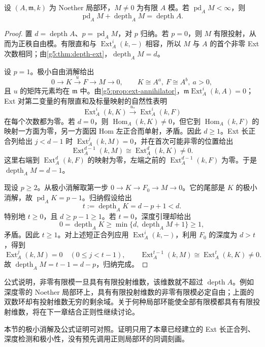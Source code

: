 \begin{theorem}\label{g5:thm:auslander-buchsbaum}
	设 \((A,\mathfrak m,k)\) 为 Noether 局部环，\(M\ne0\) 为有限 \(A\) 模。若 \(\operatorname{pd}_A M<\infty\)，则
	\[
		\operatorname{pd}_A M+\operatorname{depth}_A M
		=\operatorname{depth}A.
	\]
\end{theorem}
\begin{proof}
	置 \(d=\operatorname{depth}A\)、\(p=\operatorname{pd}_A M\)，对 \(p\) 归纳。若 \(p=0\)，则 \(M\) 有限投射，从而为正秩自由模。有限直和与 \(\operatorname{Ext}_A^i(k,-)\) 相容，所以 \(M\) 与 \(A\) 的首个非零 Ext 次数相同；由\cref{g5:thm:depth-ext}，\(\operatorname{depth}_A M=d\)。

	设 \(p=1\)。极小自由消解给出
	\[
		0\longrightarrow K\xrightarrow{u}F\longrightarrow M\longrightarrow0,
		\qquad K\cong A^a,\ F\cong A^b,\ a>0,
	\]
	且 \(u\) 的矩阵元素均在 \(\mathfrak m\) 中。由\cref{g5:prop:ext-annihilator}，\(\mathfrak m\operatorname{Ext}_A^i(k,A)=0\)；Ext 对第二变量的有限直和及标量映射的自然性表明
	\[
		\operatorname{Ext}_A^i(k,K)\xrightarrow{u_*}
		\operatorname{Ext}_A^i(k,F)
	\]
	在每个次数都为零。若 \(d=0\)，则 \(\operatorname{Hom}_A(k,K)\ne0\)，但它到 \(\operatorname{Hom}_A(k,F)\) 的映射一方面为零，另一方面因 Hom 左正合而单射，矛盾。因此 \(d\geq1\)。Ext 长正合列给出 \(j<d-1\) 时 \(\operatorname{Ext}_A^j(k,M)=0\)，并在首次可能非零的位置给出
	\[
		\operatorname{Ext}_A^{d-1}(k,M)
		\cong\operatorname{Ext}_A^d(k,K)\ne0.
	\]
	这里右端到 \(\operatorname{Ext}_A^d(k,F)\) 的映射为零，左端之前的 \(\operatorname{Ext}_A^{d-1}(k,F)\) 为零。于是 \(\operatorname{depth}_A M=d-1\)。

	现设 \(p\geq2\)。从极小消解取第一步
	\(0\to K\to F_0\to M\to0\)。它的尾部是 \(K\) 的极小消解，故 \(\operatorname{pd}_A K=p-1\)。归纳假设给出
	\[
		t:=\operatorname{depth}_A K=d-p+1<d.
	\]
	特别地 \(t\geq0\)，且 \(d\geq p-1\geq1\)。若 \(t=0\)，深度引理却给出
	\[
		0=\operatorname{depth}_A K
		\geq\min\{d,\operatorname{depth}_A M+1\}\geq1,
	\]
	矛盾。因此 \(t\geq1\)。对上述短正合列应用 \(\operatorname{Ext}_A^i(k,-)\)，利用 \(F_0\) 的深度为 \(d>t\)，得到
	\[
		\operatorname{Ext}_A^j(k,M)=0\quad(0\leq j<t-1),
		\qquad
		\operatorname{Ext}_A^{t-1}(k,M)
		\cong\operatorname{Ext}_A^t(k,K)\ne0.
	\]
	故 \(\operatorname{depth}_A M=t-1=d-p\)，归纳完成。
\end{proof}

公式说明，非零有限模一旦具有有限投射维数，该维数就不超过 \(\operatorname{depth}A\)。例如深度零的 Noether 局部环上，具有有限投射维数的非零有限模必定自由；上面的双数环却有投射维数无穷的剩余域。关于何种局部环能使全部有限模都具有有限投射维数，将在下一章结合正则性继续讨论。

\ProseParagraphBreak

本节的极小消解及公式证明可对照\cite[第19节，第153—155页]{Matsumura1989}。证明只用了本章已经建立的 Ext 长正合列、深度检测和极小性，没有预先调用正则局部环的同调刻画。
